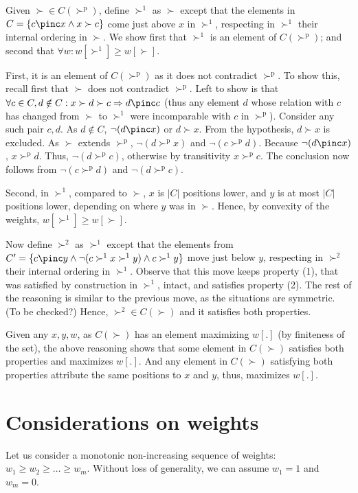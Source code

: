 \documentclass[12pt]{article}
\newcommand{\pref}{\succ}%
\newcommand{\ppref}{\succ^\text{p}}%
\begin{document}
Given ${\pref} \in C(\ppref)$, define $\pref^1$ as $\pref$ except that the elements in $C = \{c \pinc x \land x \pref c\}$ come just above $x$ in $\pref^1$, respecting in $\pref^1$ their internal ordering in $\pref$. We show first that $\pref^1$ is an element of $C(\ppref)$; and second that $\forall w: w[\pref^1] \geq w[\pref]$. 

First, it is an element of $C(\ppref)$ as it does not contradict $\ppref$. To show this, recall first that $\pref$ does not contradict $\ppref$. Left to show is that $\forall c \in C, d \notin C: x \pref d \pref c \Rightarrow d \pinc c$ (thus any element $d$ whose relation with $c$ has changed from $\pref$ to $\pref^1$ were incomparable with $c$ in $\ppref$). Consider any such pair $c, d$. As $d \notin C$, $\lnot(d \pinc x)$ or $d \pref x$. From the hypothesis, $d \pref x$ is excluded. 
As $\pref$ extends $\ppref$, $\lnot(d \ppref x)$ and $\lnot (c \ppref d)$. Because $\lnot (d \pinc x)$, $x \ppref d$. Thus, $\lnot (d \ppref c)$, otherwise by transitivity $x \ppref c$. The conclusion now follows from $\lnot (c \ppref d)$ and $\lnot (d \ppref c)$.

Second, in $\pref^1$, compared to $\pref$, $x$ is $|C|$ positions lower, and $y$ is at most $|C|$ positions lower, depending on where $y$ was in $\pref$. Hence, by convexity of the weights, $w[\pref^1] \geq w[\pref]$.

Now define $\pref^2$ as $\pref^1$ except that the elements from $C' = \{c \pinc y \land \lnot (c \pref^1 x \pref^1 y) \land c \pref^1 y\}$ move just below $y$, respecting in $\pref^2$ their internal ordering in $\pref^1$. Observe that this move keeps property (1), that was satisfied by construction in $\pref^1$, intact, and satisfies property (2). The rest of the reasoning is similar to the previous move, as the situations are symmetric. (To be checked?) Hence, ${\pref^2} \in C(\pref)$ and it satisfies both properties.

Given any $x, y, w$, as $C(\pref)$ has an element maximizing $w[.]$ (by finiteness of the set), the above reasoning shows that some element in $C(\pref)$ satisfies both properties and maximizes $w[.]$. And any element in $C(\pref)$ satisfying both properties attribute the same positions to $x$ and $y$, thus, maximizes $w[.]$.

\section{Considerations on weights}
\label{sec:weights}
Let us consider a monotonic non-increasing sequence of weights: $w_{1} \geq w_{2} \geq \ldots \geq w_{m}$. Without loss of generality, we can assume $w_1=1$ and $w_m=0$.
\end{document}
